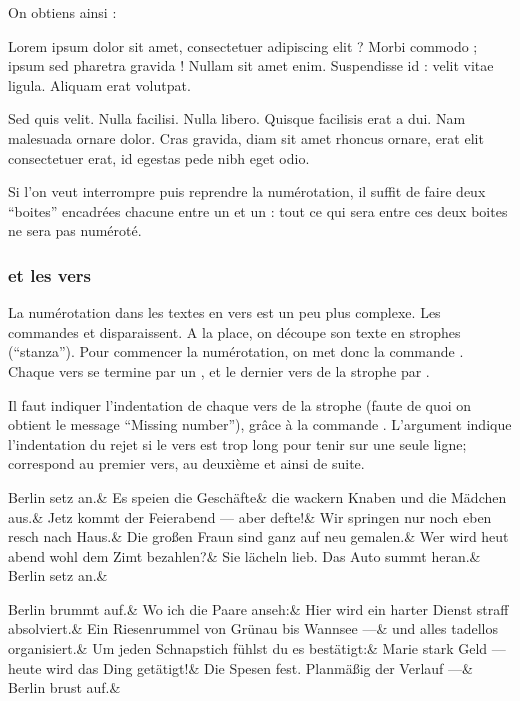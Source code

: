 On obtiens ainsi : \bigbreak

\begin{minipage}{10cm}
\beginnumbering
\pstart %
Lorem ipsum dolor sit amet, consectetuer adipiscing elit ?
Morbi commodo ; ipsum sed pharetra gravida !
Nullam sit amet enim. Suspendisse id : velit vitae ligula. 
Aliquam erat volutpat.


Sed quis velit. Nulla facilisi. Nulla libero. 
 Quisque facilisis erat a dui. %
Nam malesuada ornare dolor.
Cras gravida, diam sit amet rhoncus ornare, 
erat  elit consectetuer erat, id egestas pede nibh eget odio.
\pend
\endnumbering
\end{minipage}
\bigbreak

Si l'on veut interrompre puis reprendre la numérotation, il suffit de faire deux \enquote{boites} encadrées chacune entre un   et un :  tout ce qui sera entre ces deux boites ne sera pas numéroté.

\subsubsection{ et les vers}

La  numérotation dans les textes en vers est un peu plus complexe. Les commandes  et  disparaissent. A la place, on découpe son texte en strophes (\enquote{stanza}). Pour commencer la numérotation, on met donc la commande . Chaque vers se termine par un \ampersand , et le dernier vers de la strophe par \cs{\ampersand}.  

Il faut indiquer l'indentation de chaque vers de la strophe (faute de quoi on obtient le message \enquote{Missing number}), grâce à la commande . L'argument  indique l'indentation du rejet si le vers est trop long pour tenir sur une seule ligne;  correspond au premier vers,  au deuxième et ainsi de suite.




\begin{latexcode}
\beginnumbering
{}
\let\endstanzaextra=\bigbreak
\stanza
Berlin setz an.&
Es speien die Geschäfte&
die wackern Knaben und die Mädchen aus.&
Jetz kommt der Feierabend --- aber defte!&
Wir springen nur noch eben resch nach Haus.&
Die großen Fraun sind ganz auf neu gemalen.&
Wer wird heut abend wohl dem Zimt bezahlen?&
Sie lächeln lieb. Das Auto summt heran.&
Berlin setz an.\&

\stanza
Berlin brummt auf.&
Wo ich die Paare anseh:&
Hier wird ein harter Dienst straff absolviert.&
Ein Riesenrummel von Grünau bis Wannsee ---&
und alles tadellos organisiert.&
Um jeden Schnapstich fühlst du es bestätigt:&
Marie stark Geld --- heute wird das Ding getätigt!&
Die Spesen fest. Planmäßig der Verlauf ---&
Berlin brust auf.\&
\endnumbering
\end{latexcode}

